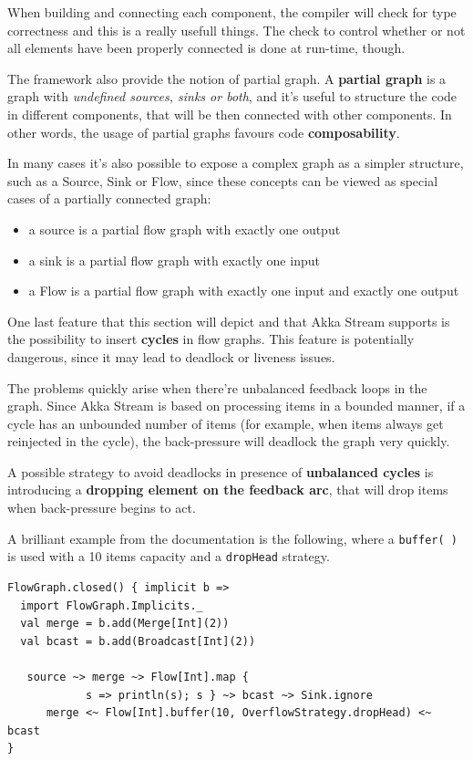 When building and connecting each component, the compiler will check for
type correctness and this is a really usefull things. The check to
control whether or not all elements have been properly connected is done
at run-time, though.

The framework also provide the notion of partial graph. A
\textbf{partial graph} is a graph with \emph{undefined sources, sinks or
both}, and it's useful to structure the code in different components,
that will be then connected with other components. In other words, the
usage of partial graphs favours code \textbf{composability}.

In many cases it's also possible to expose a complex graph as a simpler
structure, such as a Source, Sink or Flow, since these concepts can be
viewed as special cases of a partially connected graph:

\begin{itemize}
\itemsep1pt\parskip0pt
\item
  a source is a partial flow graph with exactly one output
\item
  a sink is a partial flow graph with exactly one input
\item
  a Flow is a partial flow graph with exactly one input and exactly one
  output
\end{itemize}

One last feature that this section will depict and that Akka Stream
supports is the possibility to insert \textbf{cycles} in flow graphs.
This feature is potentially dangerous, since it may lead to deadlock or
liveness issues.

The problems quickly arise when there're unbalanced feedback loops in
the graph. Since Akka Stream is based on processing items in a bounded
manner, if a cycle has an unbounded number of items (for example, when
items always get reinjected in the cycle), the back-pressure will
deadlock the graph very quickly.

A possible strategy to avoid deadlocks in presence of \textbf{unbalanced
cycles} is introducing a \textbf{dropping element on the feedback arc},
that will drop items when back-pressure begins to act.

A brilliant example from the documentation is the following, where a
\texttt{buffer(\ )} is used with a 10 items capacity and a
\texttt{dropHead} strategy.

\begin{verbatim}
FlowGraph.closed() { implicit b =>
  import FlowGraph.Implicits._
  val merge = b.add(Merge[Int](2))
  val bcast = b.add(Broadcast[Int](2))

￼  source ~> merge ~> Flow[Int].map { 
			s => println(s); s } ~> bcast ~> Sink.ignore
      merge <~ Flow[Int].buffer(10, OverflowStrategy.dropHead) <~ bcast
}
\end{verbatim}


